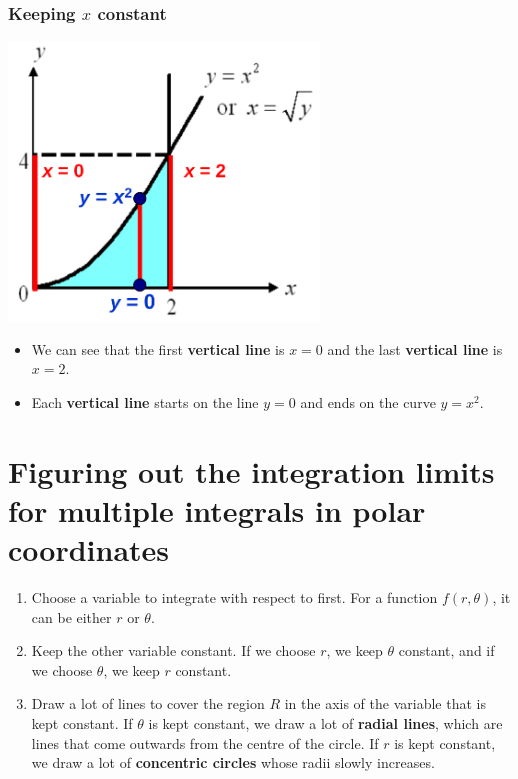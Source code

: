 \documentclass[11pt]{article}
\begin{document}
\subsubsection{Keeping \(x\) constant}
\label{sec:org60cdd8d}
\begin{center}
\includegraphics[height=20em]{./images/double-integral-hold-x-constant.png}
\end{center}
\begin{itemize}
\item We can see that the first \textbf{vertical line} is \(x = 0\) and the last \textbf{vertical line} is \(x = 2\).
\item Each \textbf{vertical line} starts on the line \(y = 0\) and ends on the curve \(y = x^2\).
\end{itemize}

\section{Figuring out the integration limits for multiple integrals in polar coordinates}
\label{sec:org85aa587}
\begin{enumerate}
\item Choose a variable to integrate with respect to first. For a function \(f(r, \theta)\), it can be either \(r\) or \(\theta\).
\item Keep the other variable constant. If we choose \(r\), we keep \(\theta\) constant, and if we choose \(\theta\), we keep \(r\) constant.
\item Draw a lot of lines to cover the region \(R\) in the axis of the variable that is kept constant. If \(\theta\) is kept constant, we draw a lot of \textbf{radial lines}, which are lines that come outwards from the centre of the circle. If \(r\) is kept constant, we draw a lot of \textbf{concentric circles} whose radii slowly increases.
\end{enumerate}
\end{document}
